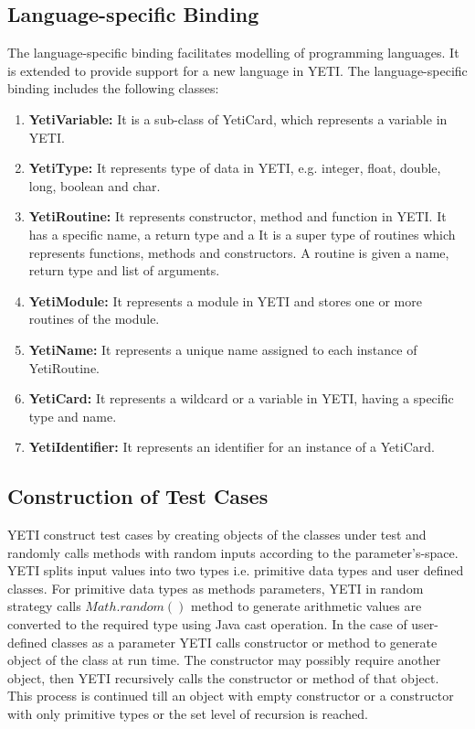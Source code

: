 \subsection{Language-specific Binding}
The language-specific binding facilitates modelling of programming languages. It is extended to provide support for a new language in YETI. The language-specific binding includes the following classes:
\begin{enumerate}
\item {\textbf{YetiVariable:}} It is a sub-class of YetiCard, which represents a variable in YETI.
\item {\textbf{YetiType:}} It represents type of data in YETI, e.g. integer, float, double, long, boolean and char.
\item {\textbf{YetiRoutine:}} It represents constructor, method and function in YETI. It has a specific name, a return type and a   It is a super type of routines which represents functions, methods and constructors. A routine is given a name, return type and list of arguments.
\item {\textbf{YetiModule:}} It represents a module in YETI and stores one or more routines of the module.
\item {\textbf{YetiName:}} It represents a unique name assigned to each instance of YetiRoutine.
\item {\textbf{YetiCard:}} It represents a wildcard or a variable in YETI, having a specific type and name.
\item {\textbf{YetiIdentifier:}} It represents an identifier for an instance of a YetiCard.
\end{enumerate}

\subsection{Construction of Test Cases}
YETI construct test cases by creating objects of the classes under test and randomly calls methods with random inputs according to the parameter's-space. YETI splits input values into two types i.e. primitive data types and user defined classes. For primitive data types as methods parameters, YETI in random strategy calls $Math.random()$ method to generate arithmetic values are converted to the required type using Java cast operation. In the case of user-defined classes as a parameter YETI calls constructor or method to generate object of the class at run time. The constructor may possibly require another object, then YETI recursively calls the constructor or method of that object. This process is continued till an object with empty constructor or a constructor with only primitive types or the set level of recursion is reached.

